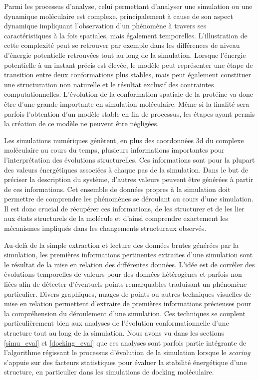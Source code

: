 Parmi les processus d'analyse, celui permettant d'analyser une simulation ou une dynamique moléculaire est complexe, principalement à cause de son aspect dynamique impliquant l'observation d'un phénomène à travers ses caractéristiques à la fois spatiales, mais également temporelles. L'illustration de cette complexité peut se retrouver par exemple dans les différences de niveau d'énergie potentielle retrouvées tout au long de la simulation. Lorsque l'énergie potentielle à un instant précis est élevée, le modèle peut représenter une étape de transition entre deux conformations plus stables, mais peut également constituer une structuration non naturelle et le résultat exclusif des contraintes computationnelles. L'évolution de la conformation spatiale de la protéine va donc être d'une grande importante en simulation moléculaire. Même si la finalité sera parfois l'obtention d'un modèle stable en fin de processus, les étapes ayant permis la création de ce modèle ne peuvent être négligées.

Les simulations numériques génèrent, en plus des coordonnées 3d du complexe moléculaire au cours du temps, plusieurs informations importantes pour l'interprétation des évolutions structurelles. Ces informations sont pour la plupart des valeurs énergétiques associées à chaque pas de la simulation. Dans le but de préciser la description du système, d'autres valeurs peuvent être générées à partir de ces informations. Cet ensemble de données propres à la simulation doit permettre de comprendre les phénomènes se déroulant au cours d'une simulation. Il est donc crucial de récupérer ces informations, de les structurer et de les lier aux états structurels de la molécule et d'ainsi comprendre exactement les mécanismes impliqués dans les changements structuraux observés.

Au-delà de la simple extraction et lecture des données brutes générées par la simulation, les premières informations pertinentes extraites d'une simulation sont le résultat de la mise en relation des différentes données. L'idée est de corréler des évolutions temporelles de valeurs pour des données hétérogènes et parfois non liées afin de détecter d'éventuels points remarquables traduisant un phénomène particulier. Divers graphiques, nuages de points ou autres techniques visuelles de mise en relation permettent d'extraire de premières informations précieuses pour la compréhension du déroulement d'une simulation. Ces techniques se couplent particulièrement bien aux analyses de l'évolution conformationnelle d'une structure tout au long de la simulation. Nous avons vu dans les sections \ref{simu_eval} et \ref{docking_eval} que ces analyses sont parfois partie intégrante de l'algorithme régissant le processus d'évolution de la simulation lorsque le \textit{scoring} s'appuie sur des facteurs statistiques pour évaluer la stabilité énergétique d'une structure, en particulier dans les simulations de docking moléculaire.

